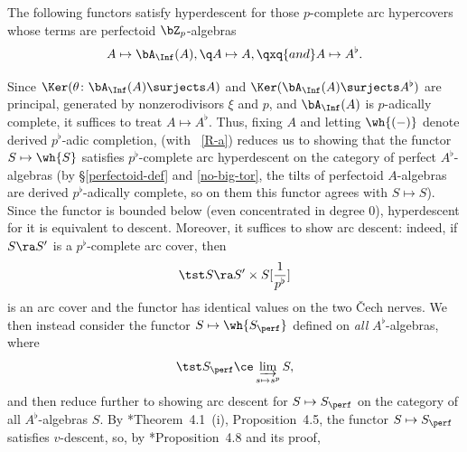 \blem \label{arc-sheaves}
The following functors satisfy hyperdescent for those $p$-complete arc hypercovers whose terms are perfectoid $\bZ_p$-algebras\ucolon
\begin{equation*} \label{}
\source{purity-flat-cohomology}
A \mapsto \bA_\Inf(A), \q A \mapsto A, \qxq{and} A \mapsto A^\flat.%
\end{equation*}
\elem

\bpf
Since $\Ker(\theta\colon \bA_{\Inf}(A) \surjects %
A)$ and $\Ker(\bA_\Inf(A) \surjects A^\flat)$ are principal, generated by nonzerodivisors $\xi$ and $p$, and $\bA_\Inf(A)$ is $p$-adically complete, it suffices to treat $A \mapsto A^\flat$. Thus, fixing $A$ and letting $\wh{(-)}$ denote derived $p^\flat$-adic completion,  (with ~\ref{R-a}) %
reduces us to showing that the functor $S \mapsto \wh{S}$ satisfies $p^\flat$-complete arc hyperdescent on the category of perfect $A^\flat$-algebras (by \S\ref{perfectoid-def} and \eqref{no-big-tor}, the tilts of perfectoid $A$-algebras are derived $p^\flat$-adically complete, so on them this functor agrees with $S \mapsto S$). Since the functor is bounded below (even concentrated in degree $0$), hyperdescent for it is equivalent to descent.  Moreover, it suffices to show arc descent: indeed, if $S \ra S'$ is a $p^\flat$-complete arc cover, then
\[
\tst S \ra S' \times S[\frac 1{p^\flat}]
\]
is an arc cover and the functor %
has identical values on the two \v{C}ech nerves. We then instead consider the functor $S\mapsto \wh{S_\perf}$ defined on \emph{all} $A^\flat$-algebras, where
\[
\tst S_\perf \ce \varinjlim_{s \mapsto s^p} S,
\]
and then reduce further to showing arc descent for $S \mapsto S_\perf$ on the category of all $A^\flat$-algebras $S$. By \cite{BS17}*{Theorem~4.1~(i), Proposition~4.5}, %
the functor $S \mapsto S_\perf$ satisfies $v$-descent, so, by  \cite{BM20}*{Proposition~4.8 and its proof}, %
